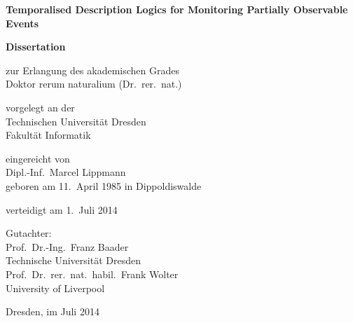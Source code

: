 \pagestyle{empty}

\begin{titlepage}
    \begin{center}
        \textbf{\textsf{\huge Temporalised Description Logics for Monitoring Partially Observable Events}}\\
        \bigskip\bigskip\bigskip


        \Large
        \textbf{Dissertation}\\
        \bigskip\bigskip

        zur Erlangung des akademischen Grades\\
        Doktor rerum naturalium (Dr.\ rer.\ nat.)\\
        \bigskip\bigskip

        vorgelegt an der\\
        Technischen Universität Dresden\\
        Fakultät Informatik\\
        \bigskip\bigskip

        eingereicht von\\
        Dipl.-Inf.\ Marcel Lippmann\\
        geboren am 11.\ April 1985 in Dippoldiswalde\\
        \bigskip\bigskip

        verteidigt am {1.\ Juli 2014}\\
        \vfill

        Gutachter:\\
        Prof.\ Dr.-Ing.\ Franz Baader\\
        Technische Universität Dresden\\[1ex]
        Prof.\ Dr.\ rer.\ nat.\ habil.\ Frank Wolter\\
        University of Liverpool

        \bigskip\bigskip

        Dresden, im Juli 2014
    \end{center}
\end{titlepage}

\cleardoublepage

\pagestyle{scrheadings}


\tableofcontents
